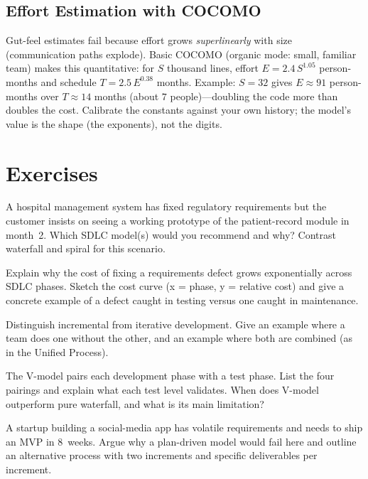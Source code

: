 \subsection{Effort Estimation with COCOMO}
\label{sec:cocomo}

Gut-feel estimates fail because effort grows \emph{superlinearly} with size (communication paths explode). Basic COCOMO (organic mode: small, familiar team) makes this quantitative: for $S$ thousand lines, effort $E=2.4\,S^{1.05}$ person-months and schedule $T=2.5\,E^{0.38}$ months. Example: $S=32$ gives $E\approx91$ person-months over $T\approx14$ months (about $7$ people)---doubling the code more than doubles the cost. Calibrate the constants against your own history; the model's value is the shape (the exponents), not the digits.

\section{Exercises}

\begin{exercise}
A hospital management system has fixed regulatory requirements but the customer insists on seeing a working prototype of the patient-record module in month~2. Which SDLC model(s) would you recommend and why? Contrast waterfall and spiral for this scenario.
\end{exercise}

\begin{exercise}
Explain why the cost of fixing a requirements defect grows exponentially across SDLC phases. Sketch the cost curve (x = phase, y = relative cost) and give a concrete example of a defect caught in testing versus one caught in maintenance.
\end{exercise}

\begin{exercise}
Distinguish incremental from iterative development. Give an example where a team does one without the other, and an example where both are combined (as in the Unified Process).
\end{exercise}

\begin{exercise}
The V-model pairs each development phase with a test phase. List the four pairings and explain what each test level validates. When does V-model outperform pure waterfall, and what is its main limitation?
\end{exercise}

\begin{exercise}
A startup building a social-media app has volatile requirements and needs to ship an MVP in 8~weeks. Argue why a plan-driven model would fail here and outline an alternative process with two increments and specific deliverables per increment.
\end{exercise}

